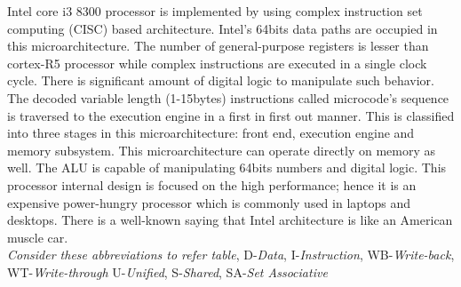 \documentclass[a4paper,11pt]{article}
\begin{document}
Intel core i3 8300 processor is implemented by using complex instruction set computing (CISC) based architecture. Intel’s 64bits data paths are occupied in this microarchitecture. The number of general-purpose registers is lesser than cortex-R5 processor while complex instructions are executed in a single clock cycle. There is significant amount of digital logic to manipulate such behavior. The decoded variable length (1-15bytes) instructions called microcode’s sequence is traversed to the execution engine in a first in first out manner. This is classified into three stages in this microarchitecture: front end, execution engine and memory subsystem. This microarchitecture can operate directly on memory as well. The ALU is capable of manipulating 64bits numbers and digital logic. This processor internal design is focused on the high performance; hence it is an expensive power-hungry processor which is commonly used in laptops and desktops. There is a well-known saying that Intel architecture is like an American muscle car.\\


{\footnotesize \textit{Consider these abbreviations to refer table},
	D-\textit{Data}, I-\textit{Instruction}, WB-\textit{Write-back}, WT-\textit{Write-through} U-\textit{Unified}, S-\textit{Shared}, SA-\textit{Set Associative}}
\end{document}
